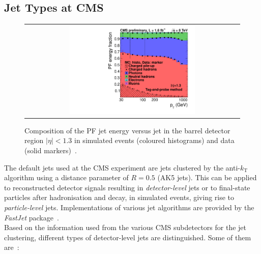 \subsection{Jet Types at CMS}
\begin{figure}[!tp]
  \centering 
  \begin{tabular}{c}
    \includegraphics[width=0.6\textwidth]{figures/calcFrac_Frac0_MC-1.pdf} 
  \end{tabular}
  \caption{Composition of the PF jet energy versus jet \pt in the barrel detector region $|\eta| < 1.3$ in simulated events (coloured histograms) and data (solid markers)~\cite{CMS-DP-2012-012}.}
  \label{fig:jets_pf_comp}
\end{figure}
\label{subsec:jets_types}
The default jets used at the CMS experiment are jets clustered by the anti-$k_\mathrm{T}$ algorithm using a distance parameter of $R = 0.5$ (AK5 jets). This can be applied to reconstructed detector signals resulting in \textit{detector-level} jets or to final-state particles after hadronisation and decay, in simulated events, giving rise to \textit{particle-level} jets. Implementations of various jet algorithms are provided by the \textit{FastJet} package~\cite{Cacciari:2011ma, Cacciari:2005hq}. \\
Based on the information used from the various CMS subdetectors for the jet clustering, different types of detector-level jets are distinguished. Some of them are~\cite{1748-0221-6-11-P11002}:
